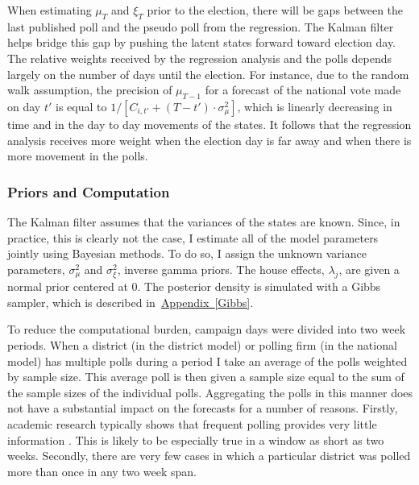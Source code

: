 \documentclass[12pt,final,fleqn]{article}
\newcommand{\aref}[1]{\hyperref[#1]{Appendix~\ref{#1}}}
\theoremstyle{plain}
\begin{document}
When estimating $\mu_T$ and $\xi_T$ prior to the election, there will be gaps between the last published poll and the pseudo poll from the regression. The Kalman filter helps bridge this gap by pushing the latent states forward toward election day. The relative weights received by the regression analysis and the polls depends largely on the number of days until the election. For instance, due to the random walk assumption, the precision of $\mu_{T-1}$ for a forecast of the national vote made on day $t'$ is equal to $1/\left[C_{i,t'} + (T-t')\cdot \sigma^2_\mu\right]$, which is linearly decreasing in time and in the day to day movements of the states. It follows that the regression analysis receives more weight when the election day is far away and when there is more movement in the polls.  

\subsubsection{Priors and Computation}
The Kalman filter assumes that the variances of the states are known. Since, in practice, this is clearly not the case, I estimate all of the model parameters jointly using Bayesian methods. To do so, I assign the unknown variance parameters, $\sigma_\mu^2$ and $\sigma_\xi^2$, inverse gamma priors. The house effects, $\lambda_j$, are given a normal prior centered at $0$. The posterior density is simulated with a Gibbs sampler, which is described in~\aref{Gibbs}.

To reduce the computational burden, campaign days were divided into two week periods. When a district (in the district model) or polling firm (in the national model) has multiple polls during a period I take an average of the polls weighted by sample size. This average poll is then given a sample size equal to the sum of the sample sizes of the individual polls. Aggregating the polls in this manner does not have a substantial impact on the forecasts for a number of reasons. Firstly, academic research typically shows that frequent polling provides very little information \citep[e.g.][]{gelman1993american, lock2010bayesian}. This is likely to be especially true in a window as short as two weeks. Secondly, there are very few cases in which a particular district was polled more than once in any two week span. 
\end{document}
